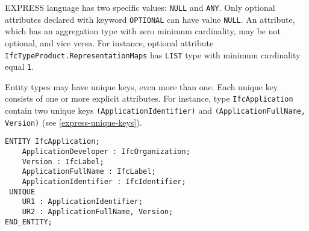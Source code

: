 EXPRESS language has two specific values: \texttt{NULL} and \texttt{ANY}.
Only optional attributes declared with keyword \texttt{OPTIONAL} can have value \texttt{NULL}.
An attribute, which has an aggregation type with zero minimum cardinality, may be not optional, and vice versa.
For instance, optional attribute \texttt{IfcTypeProduct.RepresentationMaps} has \texttt{LIST} type with minimum cardinality equal \texttt{1}.


Entity types may have unique keys, even more than one.
Each unique key consists of one or more explicit attributes.
For instance, type \texttt{IfcApplication} contain two unique keys \texttt{(ApplicationIdentifier)} and \texttt{(ApplicationFullName, Version)} (see \autoref{express-unique-keys}).


\begin{lstlisting}[caption={},label=lst:express-unique-keys]
ENTITY IfcApplication;
	ApplicationDeveloper : IfcOrganization;
	Version : IfcLabel;
	ApplicationFullName : IfcLabel;
	ApplicationIdentifier : IfcIdentifier;
 UNIQUE
	UR1 : ApplicationIdentifier;
	UR2 : ApplicationFullName, Version;
END_ENTITY;
\end{lstlisting}


    
    
  
    
    
    
    
    
    



